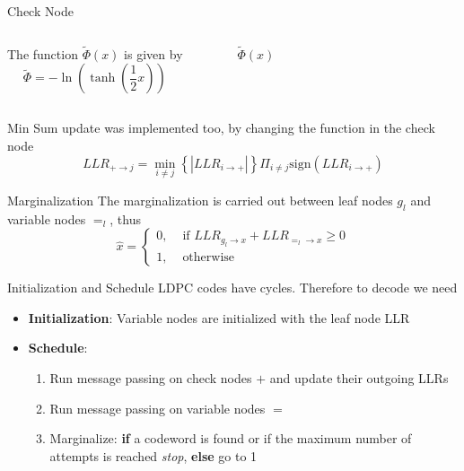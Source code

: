 \documentclass[pdf]
          {beamer}
\newlength\fheight
\newlength\fwidth
\begin{document}
\begin{frame}{Check Node}
	\begin{columns}
	The function $\tilde{\Phi} (x) $ is given by
	$$
		\tilde{\Phi} = - \ln \left( \tanh \left(\frac{1}{2} x\right)\right)
	$$
	\begin{figure}[t]
		\centering
		\setlength{}
		\setlength{}
		
		\caption{$\tilde{\Phi}(x)$}
		\label{fig:info_uni}
	\end{figure}
	\end{columns}
	\vfill
	Min Sum update was implemented too, by changing the function in the check node
	$$
		LLR_{+\rightarrow j} = \min_{i \ne j} \left\{ |LLR_{i \rightarrow +}| \right\} \Pi_{i \ne j} \mbox{sign} \left( LLR_{i \rightarrow +} \right)
	$$

\end{frame}

\begin{frame}{Marginalization}
	The marginalization is carried out between leaf nodes $g_l$ and variable nodes $=_l$, thus
	$$
		\hat{x} =
		\begin{cases}
			0, &\text{ if }LLR_{g_l \rightarrow x} + LLR_{=_l \rightarrow x} \ge 0\\
			1, &\text{ otherwise }
		\end{cases}
	$$
\end{frame}

\begin{frame}{Initialization and Schedule}
	LDPC codes have cycles. Therefore to decode we need
	\begin{itemize}
		\item \textbf{Initialization}: Variable nodes are initialized with the leaf node LLR
		\item \textbf{Schedule}: 
		\begin{enumerate}
			\item Run message passing on check nodes $+$ and update their outgoing LLRs
			\item Run message passing on variable nodes $=$
			\item Marginalize: \textbf{if} a codeword is found or if the maximum number of attempts is reached \textit{stop}, \textbf{else} go to 1
		\end{enumerate}
	\end{itemize}
\end{frame}
\end{document}
